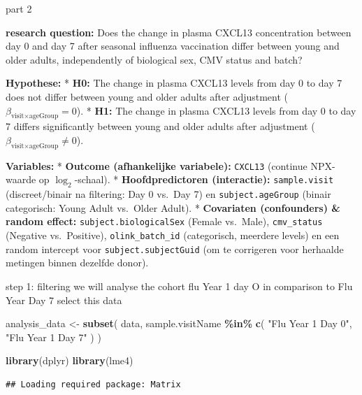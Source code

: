 \documentclass[
]{article}
\newenvironment{Shaded}{\begin{snugshade}}{\end{snugshade}}
\newcommand{\FunctionTok}[1]{\textcolor[rgb]{0.13,0.29,0.53}{\textbf{#1}}}
\newcommand{\NormalTok}[1]{#1}
\newcommand{\OtherTok}[1]{\textcolor[rgb]{0.56,0.35,0.01}{#1}}
\newcommand{\SpecialCharTok}[1]{\textcolor[rgb]{0.81,0.36,0.00}{\textbf{#1}}}
\newcommand{\StringTok}[1]{\textcolor[rgb]{0.31,0.60,0.02}{#1}}
\begin{document}
part 2

\textbf{research question:} Does the change in plasma CXCL13
concentration between day 0 and day 7 after seasonal influenza
vaccination differ between young and older adults, independently of
biological sex, CMV status and batch?

\textbf{Hypothese:} * \textbf{H0:} The change in plasma CXCL13 levels
from day 0 to day 7 does not differ between young and older adults after
adjustment (\(\beta_{\text{visit} \times \text{ageGroup}} = 0\)). *
\textbf{H1:} The change in plasma CXCL13 levels from day 0 to day 7
differs significantly between young and older adults after adjustment
(\(\beta_{\text{visit} \times \text{ageGroup}} \neq 0\)).

\textbf{Variables:} * \textbf{Outcome (afhankelijke variabele):}
\texttt{CXCL13} (continue NPX-waarde op \(\log_2\)-schaal). *
\textbf{Hoofdpredictoren (interactie):} \texttt{sample.visit}
(discreet/binair na filtering: Day 0 vs.~Day 7) en
\texttt{subject.ageGroup} (binair categorisch: Young Adult vs.~Older
Adult). * \textbf{Covariaten (confounders) \& random effect:}
\texttt{subject.biologicalSex} (Female vs.~Male), \texttt{cmv\_status}
(Negative vs.~Positive), \texttt{olink\_batch\_id} (categorisch,
meerdere levels) en een random intercept voor
\texttt{subject.subjectGuid} (om te corrigeren voor herhaalde metingen
binnen dezelfde donor).

step 1: filtering we will analyse the cohort flu Year 1 day O in
comparison to Flu Year Day 7 select this data

\begin{Shaded}
\begin{Highlighting}[]
\NormalTok{analysis\_data }\OtherTok{\textless{}{-}} \FunctionTok{subset}\NormalTok{(}
\NormalTok{  data,}
\NormalTok{  sample.visitName }\SpecialCharTok{\%in\%} \FunctionTok{c}\NormalTok{(}
    \StringTok{"Flu Year 1 Day 0"}\NormalTok{,}
    \StringTok{"Flu Year 1 Day 7"}
\NormalTok{  )}
\NormalTok{)}
\end{Highlighting}
\end{Shaded}

\begin{Shaded}
\begin{Highlighting}[]
\FunctionTok{library}\NormalTok{(dplyr)}
\FunctionTok{library}\NormalTok{(lme4)}
\end{Highlighting}
\end{Shaded}

\begin{verbatim}
## Loading required package: Matrix
\end{verbatim}
\end{document}
